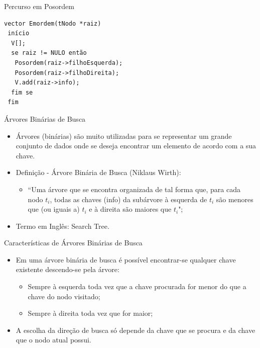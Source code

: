 \documentclass[12pt,table,xcolor={dvipsnames}]{beamer}
\begin{document}
\begin{frame}[fragile]{Percurso em Posordem}
          \begin{lstlisting}
vector Emordem(tNodo *raiz)
 início
  V[];
  se raiz != NULO então
   Posordem(raiz->filhoEsquerda); 		 		
   Posordem(raiz->filhoDireita);
   V.add(raiz->info);
  fim se
 fim
		  \end{lstlisting}
\end{frame} 

\begin{frame}[fragile]{Árvores Binárias de Busca}
          \begin{itemize}
          \item Árvores (binárias) são muito utilizadas para se representar um grande conjunto de dados onde se deseja encontrar um elemento de acordo com a sua chave.
          \item Definição - Árvore Binária de Busca (Niklaus Wirth):
          \begin{itemize}
          \item “Uma árvore que se encontra organizada de tal forma que, para cada nodo $t_i$, todas as chaves (info) da subárvore à esquerda de $t_i$ são menores que (ou iguais a) $t_i$ e à direita são maiores que $t_i$";
          \end{itemize}
          \item Termo em Inglês: Search Tree.
       	  \end{itemize}
\end{frame}

\begin{frame}[fragile]{Características de Árvores Binárias de Busca}
          \begin{itemize}
          \item Em uma árvore binária de busca é possível encontrar-se qualquer chave existente descendo-se pela árvore:
          \begin{itemize}
          \item Sempre à esquerda toda vez que a chave procurada for menor do que a chave do nodo visitado;
          \item Sempre à direita toda vez que for maior;
          \end{itemize}
          \item A escolha da direção de busca só depende da chave que se procura e da chave que o nodo atual possui.
       	  \end{itemize}
\end{frame}
\end{document}

